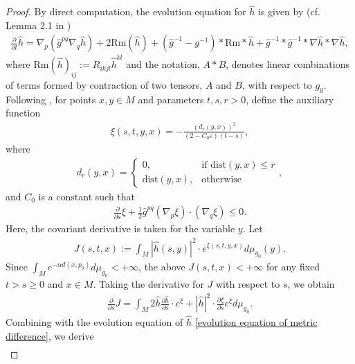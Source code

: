 \documentclass[12pt]{amsart}
\begin{document}
\begin{proof}
By direct computation, the evolution equation for $\hat{h}$ is given by (cf. Lemma 2.1 in \cite{Sh1989})
\begin{align}\label{evolution equation of metric difference}
    \frac{\partial}{\partial t} \hat{h} = \nabla_{p} (\hat{g}^{pq}\nabla_q \hat{h}) + 2\mathrm{Rm}(\hat{h}) + (\hat{g}^{-1} - g^{-1}) \ast \mathrm{Rm} \ast \hat{h} + \hat{g}^{-1} \ast \hat{g}^{-1}\ast \nabla \hat{h} \ast \nabla \hat{h},
\end{align}
where $\mathrm{Rm}(\hat{h})_{ij} := R_{ikjl}\hat{h}^{kl}$ and the notation, $A*B$, denotes linear combinations of terms formed by contraction of two tensors, $A$ and $B$, with respect to $g_0$. Following \cite{LY2010}, for points $x, y \in M$ and parameters $t, s, r > 0$, define the auxiliary function
\begin{align}
    \xi(s, t, y, x) = - \frac{ \left( d_r(y, x) \right)^2}{(2 - C_0 \varepsilon)(t - s)}, 
\end{align}
where 
\begin{align*}
    d_r(y, x) = 
    \begin{cases}
        0, & \text{if } \mathrm{dist}(y, x) \leq r \\
        \mathrm{dist}(y, x), & \text{otherwise} 
    \end{cases},
\end{align*}
and $C_0$ is a constant such that 
\begin{align}
    \frac{\partial}{\partial s} \xi + \frac{1}{2} \hat{g}^{pq}(\nabla_p \xi) \cdot (\nabla_q \xi) \leq 0.
\end{align}
Here, the covariant derivative is taken for the variable $y$. Let 
\begin{align}
    J(s, t, x) := \int_{M} |\hat{h}(s, y)|^2\cdot e^{\xi(s, t, y, x)} d\mu_{g_0}(y).
\end{align}
Since $\int_M e^{-\alpha d(x, p_0)} d\mu_{g_0} < +\infty$, the above $J(s, t, x) < +\infty$ for any fixed $ t > s \geq 0$ and $x\in M$. Taking the derivative for $J$ with respect to $s$, we obtain
\begin{align}
    \frac{\partial}{\partial s} J = \int_M 2 \hat{h} \frac{\partial \hat{h}}{\partial s} \cdot e^\xi + | \hat{h} |^2 \cdot \frac{\partial \xi}{\partial s} e^\xi d\mu_{g_0}. 
\end{align}
Combining with the evolution equation of $\hat{h}$ \eqref{evolution equation of metric difference}, we derive
\begin{equation}
    \begin{split}

\end{split}
\end{equation}
\end{proof}
\end{document}
